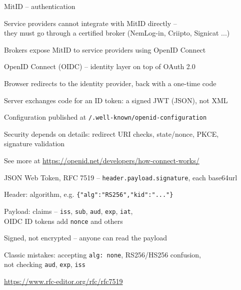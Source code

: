 \documentclass[Screen16to9,17pt]{foils}
\begin{document}

\begin{list1}
\item MitID -- authentication
  \begin{list2}
  \item Service providers cannot integrate with MitID directly --\\
    they must go through a certified broker (NemLog-in, Criipto, Signicat ...)
  \item Brokers expose MitID to service providers using OpenID Connect
  \end{list2}
\item OpenID Connect (OIDC) -- identity layer on top of OAuth 2.0
  \begin{list2}
  \item Browser redirects to the identity provider, back with a one-time code
  \item Server exchanges code for an ID token: a signed JWT (JSON), not XML
  \item Configuration published at \verb+/.well-known/openid-configuration+
  \item Security depends on details: redirect URI checks, state/nonce, PKCE,\\
    signature validation
  \end{list2}
\end{list1}

See more at \url{https://openid.net/developers/how-connect-works/}


\begin{list2}
\item JSON Web Token, RFC 7519 -- \verb+header.payload.signature+, each base64url
\item Header: algorithm, e.g. \verb+{"alg":"RS256","kid":"..."}+
\item Payload: claims -- \verb+iss+, \verb+sub+, \verb+aud+, \verb+exp+, \verb+iat+,\\
  OIDC ID tokens add \verb+nonce+ and others
\item Signed, not encrypted -- anyone can read the payload
\item Classic mistakes: accepting \verb+alg: none+, RS256/HS256 confusion,\\
  not checking \verb+aud+, \verb+exp+, \verb+iss+
\end{list2}

\url{https://www.rfc-editor.org/rfc/rfc7519}
\end{document}
